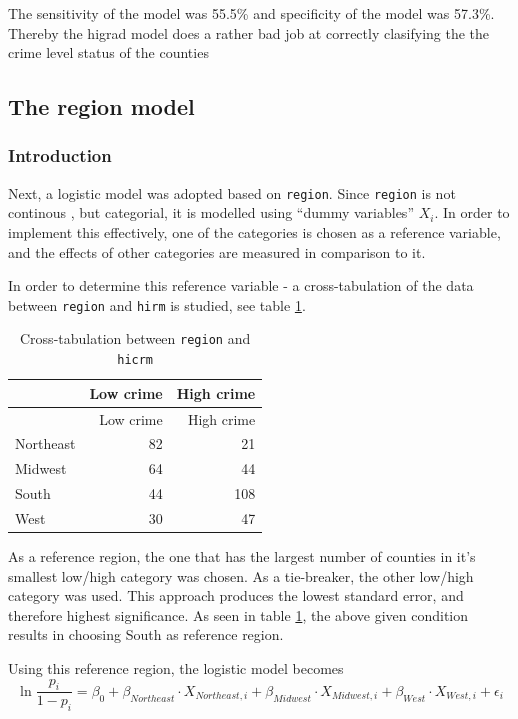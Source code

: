 \documentclass[a4paper]{article}
\begin{document}
The sensitivity of the model was 55.5\% and specificity of the model was
57.3\%. Thereby the higrad model does a rather bad job at correctly
clasifying the the crime level status of the counties

\hypertarget{the-region-model}{%
\subsection{The region model}\label{the-region-model}}

\hypertarget{introduction-2}{%
\subsubsection{Introduction}\label{introduction-2}}

Next, a logistic model was adopted based on \texttt{region}. Since
\texttt{region} is not continous , but categorial, it is modelled using
``dummy variables'' \(X_i\). In order to implement this effectively, one
of the categories is chosen as a reference variable, and the effects of
other categories are measured in comparison to it.

In order to determine this reference variable - a cross-tabulation of
the data between \texttt{region} and \texttt{hirm} is studied, see table
\ref{tab:cross-tabulation}.

\begin{longtable}[]{@{}lrr@{}}
\caption{\label{tab:cross-tabulation}Cross-tabulation between
\texttt{region} and \texttt{hicrm}}\tabularnewline
\toprule
& Low crime & High crime\tabularnewline
\midrule
\endfirsthead
\toprule
& Low crime & High crime\tabularnewline
\midrule
\endhead
Northeast & 82 & 21\tabularnewline
Midwest & 64 & 44\tabularnewline
South & 44 & 108\tabularnewline
West & 30 & 47\tabularnewline
\bottomrule
\end{longtable}

As a reference region, the one that has the largest number of counties
in it's smallest low/high category was chosen. As a tie-breaker, the
other low/high category was used. This approach produces the lowest
standard error, and therefore highest significance. As seen in table
\ref{tab:cross-tabulation}, the above given condition results in
choosing South as reference region.

Using this reference region, the logistic model becomes \begin{equation}
  \ln{\frac{p_i}{1 - p_i}} = \beta_0 + \beta_{Northeast} \cdot X_{Northeast,i} + \beta_{Midwest} \cdot X_{Midwest,i} + \beta_{West} \cdot X_{West,i} + \epsilon_i
\end{equation}
\end{document}

